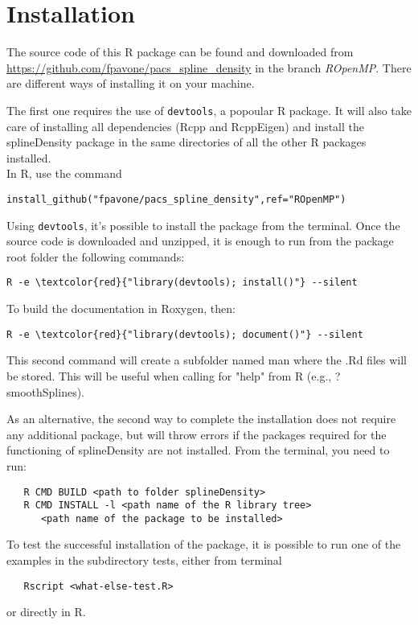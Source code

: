 \chapter{Installation}
\label{installation}

\noindent 
The source code of this R package can be found and downloaded from \url{https://github.com/fpavone/pacs_spline_density} in the branch \textit{ROpenMP}. 
There are different ways of installing it on your machine.

The first one requires the use of \verb|devtools|, a popoular R package. It will also take care of installing all dependencies (Rcpp and RcppEigen) and install the splineDensity package in the same directories of all the other R packages installed.  \\
In R, use the command 
\begin{Verbatim}[commandchars=\\\{\}]
install_github("fpavone/pacs_spline_density",ref="ROpenMP")
\end{Verbatim}
Using \verb|devtools|, it's possible to install the package from the terminal.
Once the source code is downloaded and unzipped, it is enough to run from the package root folder the following commands:
\begin{Verbatim}[commandchars=\\\{\}]
   R -e \textcolor{red}{"library(devtools); install()"} --silent
\end{Verbatim}
To build the documentation in Roxygen, then:
\begin{Verbatim}[commandchars=\\\{\}]
   R -e \textcolor{red}{"library(devtools); document()"} --silent
\end{Verbatim}

This second command will create a subfolder named man where the .Rd files will be stored. This will be useful when calling for "help" from R (e.g., ?smoothSplines).

As an alternative, the second way to complete the installation does not require any additional package, but will throw errors if the packages required for the functioning of splineDensity are not installed.
From the terminal, you need to run:
\begin{verbatim}
   R CMD BUILD <path to folder splineDensity>
   R CMD INSTALL -l <path name of the R library tree> 
      <path name of the package to be installed>
\end{verbatim}

To test the successful installation of the package, it is possible to run one of the examples in the subdirectory tests, either from terminal
\begin{verbatim}
   Rscript <what-else-test.R>
\end{verbatim}
or directly in R.

